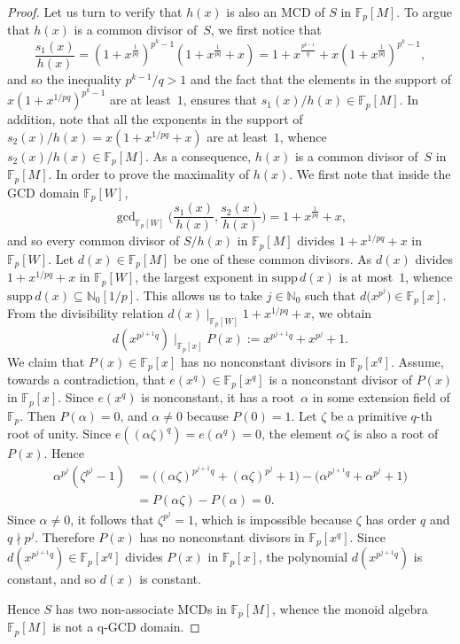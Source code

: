 \documentclass[10pt]{amsart}
\theoremstyle{definition}
\theoremstyle{remark}
\numberwithin{equation}{section}
\newcommand{\ff}{\mathbb{F}}
\newcommand{\nn}{\mathbb{N}}
\begin{document}
\begin{proof}
  Let us turn to verify that $h(x)$ is also an MCD of $S$ in $\ff_p[M]$. To argue that $h(x)$ is a common divisor of~$S$, we first notice that
  \[
    \frac{s_1(x)}{h(x)} = (1+x^{\frac1{pq}})^{p^k-1}(1+x^{\frac1{pq}}+x) = 1+x^{\frac{p^{k-1}}q} + x(1+x^{\frac1{pq}})^{p^k-1},
  \]
  and so the inequality $p^{k-1}/q > 1$ and the fact that the elements in the support of $x(1+x^{1/pq})^{p^k-1}$ are at least~$1$, ensures that $s_1(x)/h(x) \in \ff_p[M]$. In addition, note that all the exponents in the support of $s_2(x)/h(x) = x(1+x^{1/pq}+x)$ are at least~$1$, whence $s_2(x)/h(x) \in \ff_p[M]$. As a consequence, $h(x)$ is a common divisor of~$S$ in $\ff_p[M]$. In order to prove the maximality of $h(x)$. We first note that inside the GCD domain $\ff_p[W]$,
  \[
    \gcd\nolimits_{\ff_p[W]}\bigg( \frac{s_1(x)}{h(x)}, \frac{s_2(x)}{h(x)} \bigg) = 1 + x^{\frac1{pq}} + x,
  \]
  and so every common divisor of $S/h(x)$ in $\ff_p[M]$ divides $1+x^{1/pq}+x$ in $\ff_p[W]$. Let $d(x) \in \ff_p[M]$ be one of these common divisors. As $d(x)$ divides $1+x^{1/pq}+x$ in $\ff_p[W]$, the largest exponent in $\text{supp}\, d(x)$ is at most~$1$, whence $\text{supp}\, d(x) \subseteq \nn_0[1/p]$. This allows us to take $j \in \nn_0$ such that $d\big(x^{p^j}\big) \in \ff_p[x]$. From the divisibility relation $d(x) \mid_{\ff_p[W]} 1+x^{1/pq}+x$, we obtain
  \[
    d(x^{p^{j+1}q}) \mid_{\ff_p[x]} P(x) := x^{p^{j+1}q} + x^{p^j} + 1.
  \]
  We claim that $P(x) \in \ff_p[x]$ has no nonconstant divisors in $\ff_p[x^q]$. Assume, towards a contradiction, that $e(x^q) \in \ff_p[x^q]$ is a nonconstant divisor of $P(x)$ in $\ff_p[x]$. Since $e(x^q)$ is nonconstant, it has a root~$\alpha$ in some extension field of $\ff_p$. Then $P(\alpha)=0$, and $\alpha \neq 0$ because $P(0)=1$. Let $\zeta$ be a primitive $q$-th root of unity. Since $e((\alpha\zeta)^q)=e(\alpha^q)=0$, the element $\alpha\zeta$ is also a root of $P(x)$. Hence
  \begin{align*}
    \alpha^{p^j}(\zeta^{p^j}-1)
      &= \big((\alpha\zeta)^{p^{j+1}q}+ (\alpha\zeta)^{p^j}+1\big) - \big(\alpha^{p^{j+1}q}+\alpha^{p^j}+1\big) \\
      &= P(\alpha\zeta)-P(\alpha) = 0.
  \end{align*}
  Since $\alpha \neq 0$, it follows that $\zeta^{p^j}=1$, which is impossible because $\zeta$ has order $q$ and $q \nmid p^j$. Therefore $P(x)$ has no nonconstant divisors in $\ff_p[x^q]$. Since $d(x^{p^{j+1}q}) \in \ff_p[x^q]$ divides $P(x)$ in $\ff_p[x]$, the polynomial $d(x^{p^{j+1}q})$ is constant, and so $d(x)$ is constant.

  Hence $S$ has two non-associate MCDs in $\ff_p[M]$, whence the monoid algebra $\ff_p[M]$ is not a q-GCD domain.
\end{proof}
\end{document}

